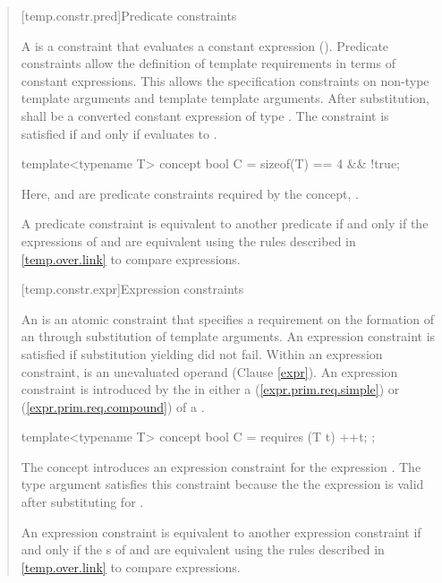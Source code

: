 \begin{quote}
[temp.constr.pred]{Predicate constraints}

\pnum
A  is a constraint that evaluates a constant 
expression  ().
% 
\enternote
Predicate constraints allow the definition of template requirements
in terms of constant expressions. This allows the specification 
constraints on non-type template arguments and template template 
arguments.
\exitnote
% 
After substitution,  shall be a converted constant expression of 
type .
% 
The constraint is satisfied if and only if  evaluates to 
.
% 
\enterexample
\begin{codeblock}
template<typename T> concept bool C = sizeof(T) == 4 && !true;
\end{codeblock}
Here,  and  are 
predicate constraints required by the concept, .
\exitexample

\pnum
A predicate constraint  is equivalent to another predicate
 if and only if the expressions of  and 
are equivalent using the rules described in \ref{temp.over.link} to compare
expressions.


[temp.constr.expr]{Expression constraints}

\pnum
An  is an atomic constraint
that specifies a requirement on the formation of an
 
through substitution of template arguments.
% 
An expression constraint is satisfied if substitution 
yielding  did not fail. 
% 
Within an expression constraint,  is an unevaluated 
operand (Clause \ref{expr}).
% 
\enternote
An expression constraint is introduced by the  in 
either a  (\ref{expr.prim.req.simple})
or  (\ref{expr.prim.req.compound})
of a .
\exitnote
% 
\enterexample
\begin{codeblock}
template<typename T> concept bool C = requires (T t) { ++t; };
\end{codeblock}
The concept  introduces an expression constraint for 
the expression .
% 
The type argument  satisfies this constraint because the
the expression  is valid after substituting 
for .
\exitexample

\pnum
An expression constraint  is equivalent to another expression
constraint  if and only if the s of
 and  are equivalent using the rules described 
in \ref{temp.over.link} to compare expressions.



\end{quote}
